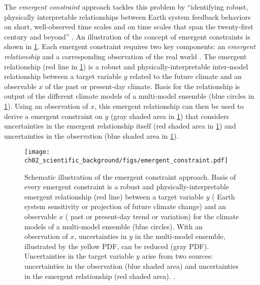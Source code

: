The \emph{emergent constraint} approach tackles this problem by
\enquote{identifying robust, physically interpretable relationships between
  Earth system feedback behaviors on short, well-observed time scales and on
  time scales that span the twenty-first century and beyond}
\autocite{Eyring2019}. An illustration of the concept of emergent constraints
is shown in \cref{fig:02:emergent_constraint}. Each emergent constraint
requires two key components: an \emph{emergent relationship} and a
corresponding observation of the real world \autocite{Eyring2019}. The emergent
relationship (red line in \cref{fig:02:emergent_constraint}) is a robust and
physically-interpretable inter-model relationship between a target variable $y$
related to the future climate and an observable $x$ of the past or present-day
climate. Basis for the relationship is output of the different climate models
of a multi-model ensemble (blue circles in \cref{fig:02:emergent_constraint}).
Using an observation of $x$, this emergent relationship can then be used to
derive a emergent constraint on $y$ (gray shaded area in
\cref{fig:02:emergent_constraint}) that considers uncertainties in the emergent
relationship itself (red shaded area in \cref{fig:02:emergent_constraint}) and
uncertainties in the observation (blue shaded area in
\cref{fig:02:emergent_constraint}).

\begin{figure}[t]
  \centering
  \texttt{[image: 
    ch02\_scientific\_background/figs/emergent\_constraint.pdf]}
  \caption{Schematic illustration of the emergent constraint approach. Basis of
    every emergent constraint is a robust and physically-interpretable emergent
    relationship (red line) between a target variable $y$ (\eg{} Earth system
    sensitivity or projection of future climate change) and an observable $x$
    (\eg{} past or present-day trend or variation) for the climate models of a
    multi-model ensemble (blue circles). With an observation of $x$,
    uncertainties in $y$ in the multi-model ensemble, illustrated by the yellow
    \acf{PDF}, can be reduced (gray \acs{PDF}). Uncertainties in the target
    variable $y$ arise from two sources: uncertainties in the observation (blue
    shaded area) and uncertainties in the emergent relationship (red shaded
    area). .}
  \label{fig:02:emergent_constraint}
\end{figure}

